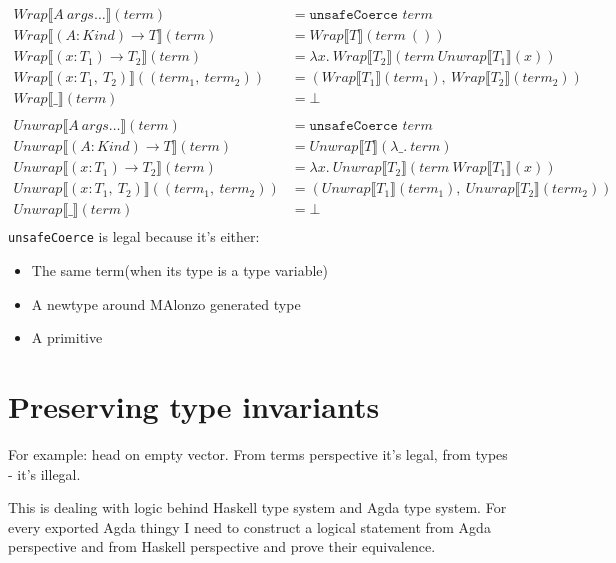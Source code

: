 \begin{align*}
   Wrap\llbracket A\ args\ldots \rrbracket(term) &= \texttt{unsafeCoerce } term\\
   Wrap\llbracket (A : Kind) \rightarrow T \rrbracket(term) &= Wrap\llbracket T \rrbracket(term\ ())\\
   Wrap\llbracket (x : T_1) \rightarrow T_2 \rrbracket(term) &=
      \lambda x.\ Wrap\llbracket T_2 \rrbracket(term\ Unwrap\llbracket T_1 \rrbracket(x))\\
   Wrap\llbracket (x : T_1,\ T_2) \rrbracket((term_1,\ term_2)) &=
      (Wrap\llbracket T_1 \rrbracket(term_1),\ Wrap\llbracket T_2 \rrbracket(term_2))\\
   Wrap\llbracket \_ \rrbracket(term) &= \bot\\
   \\
   Unwrap\llbracket A\ args\ldots \rrbracket(term) &= \texttt{unsafeCoerce } term\\
   Unwrap\llbracket (A : Kind) \rightarrow T \rrbracket(term) &= Unwrap\llbracket T \rrbracket(\lambda \_.\ term)\\
   Unwrap\llbracket (x : T_1) \rightarrow T_2 \rrbracket(term) &=
      \lambda x.\ Unwrap\llbracket T_2 \rrbracket(term\ Wrap\llbracket T_1 \rrbracket(x))\\
   Unwrap\llbracket (x : T_1,\ T_2) \rrbracket((term_1,\ term_2)) &=
      (Unwrap\llbracket T_1 \rrbracket(term_1),\ Unwrap\llbracket T_2 \rrbracket(term_2))\\
   Unwrap\llbracket \_ \rrbracket(term) &= \bot\\
\end{align*}
\texttt{unsafeCoerce} is legal because it's either:
\begin{itemize}
\item The same term(when its type is a type variable)
\item A newtype around MAlonzo generated type
\item A primitive
\end{itemize}

\section{Preserving type invariants}

For example: head on empty vector. From terms perspective it's legal, from types - it's illegal.

This is dealing with logic behind Haskell type system and Agda type system.
For every exported Agda thingy I need to construct a logical statement from
Agda perspective and from Haskell perspective and prove their equivalence.

